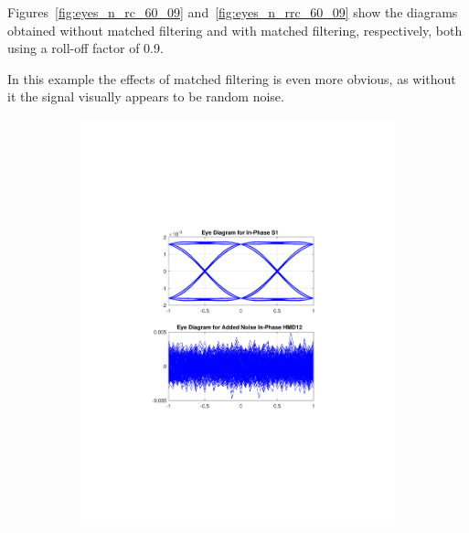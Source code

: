 Figures~\ref{fig:eyes_n_rc_60_09} and~\ref{fig:eyes_n_rrc_60_09} show the
diagrams obtained without matched filtering and with matched filtering,
respectively, both using a roll-off factor of 0.9.

In this example the effects of matched filtering is even more obvious, as
without it the signal visually appears to be random noise.

\begin{figure}[H]
	\centering
	\begin{subfigure}{.45\textwidth}
		\centering
		\includegraphics[clip, trim=5cm 4cm 5cm 4cm, width=\textwidth]{./sdf/m_qam_system/figures/eyes/if_n_nmf_60_60_rc_09.pdf}
	\end{subfigure}
	\begin{subfigure}{.45\textwidth}
		\centering

\end{subfigure}
\end{figure}
